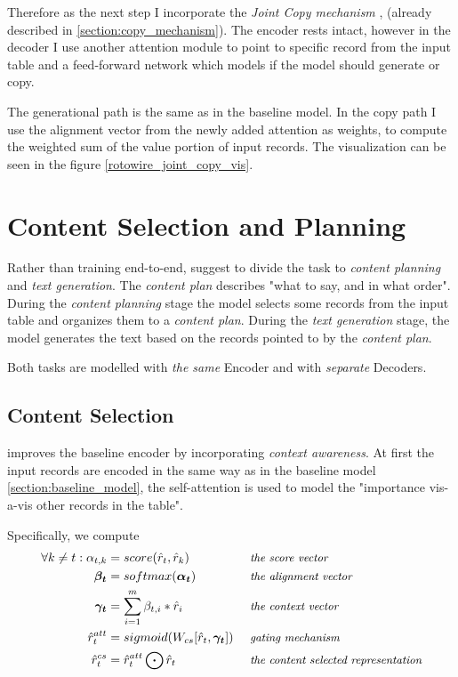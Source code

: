 Therefore as the next step I incorporate the \emph{Joint Copy mechanism} \citep{gu2016incorporating}, \citep{yang2016referenceaware} (already described in \ref{section:copy_mechanism}). The encoder rests intact, however in the decoder I use another attention module to point to specific record from the input table and a feed-forward network which models if the model should generate or copy.

The generational path is the same as in the baseline model. In the copy path I use the alignment vector from the newly added attention as weights, to compute the weighted sum of the value portion of input records. The visualization can be seen in the figure \ref{rotowire_joint_copy_vis}.

\section{Content Selection and Planning} \label{section:content_selection_and_planning}

Rather than training end-to-end, \citep{puduppully2019datatotext} suggest to divide the task to \emph{content planning} and \emph{text generation}. The \emph{content plan} describes "what to say, and in what order". During the \emph{content planning} stage the model selects some records from the input table and organizes them to a \emph{content plan}. During the \emph{text generation} stage, the model generates the text based on the records pointed to by the \emph{content plan}.

Both tasks are modelled with \emph{the same} Encoder and with \emph{separate} Decoders.

\subsection{Content Selection} \label{subsection:content_selection}

\citep{puduppully2019datatotext} improves the baseline encoder by incorporating \emph{context awareness}. At first the input records are encoded in the same way as in the baseline model \ref{section:baseline_model}, the self-attention is used to model the "importance vis-a-vis other records in the table".

Specifically, we compute
\begin{align*}
\forall k \neq t : \alpha_{t, k} &= score(\hat{r}_t, \hat{r}_k)                         &&\mbox{ \small \emph{the score vector}}\\
\boldsymbol{\beta_t}             &= softmax(\boldsymbol{\alpha_t})                      &&\mbox{ \small \emph{the alignment vector}}\\
\boldsymbol{\gamma_t}            &= \sum_{i=1}^m{\beta_{t, i} * \hat{r}_i}               &&\mbox{ \small \emph{the context vector}}\\
\hat{r}_t^{att}                  &= sigmoid( W_{cs} [\hat{r}_t, \boldsymbol{\gamma_t}] ) &&\mbox{ \small \emph{gating mechanism}}\\
\hat{r}_t^{cs}                   &= \hat{r}_t^{att} \bigodot \hat{r}_t                  &&\mbox{ \small \emph{the content selected representation}}
\end{align*}

